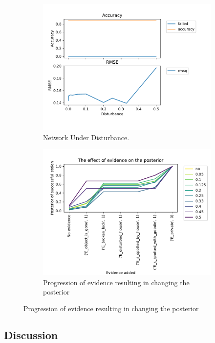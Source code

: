 \begin{figure}[htbp]
\begin{center}
\begin{subfigure}{.5\textwidth}
\includegraphics[width=0.9\linewidth]{../experiments/StolenLaptop/plots/performance_StolenLaptop.pdf}
\caption{Network Under Disturbance.}
\label{dist}
\end{subfigure}%
\begin{subfigure}{.5\textwidth}
\includegraphics[width=0.9\linewidth]{../experiments/StolenLaptop/plots/posterior_StolenLaptop.pdf}
\caption{ Progression of evidence resulting in changing the posterior}
\label{post}
\end{subfigure}
\end{center}
\end{figure}



\subsection{Discussion}

